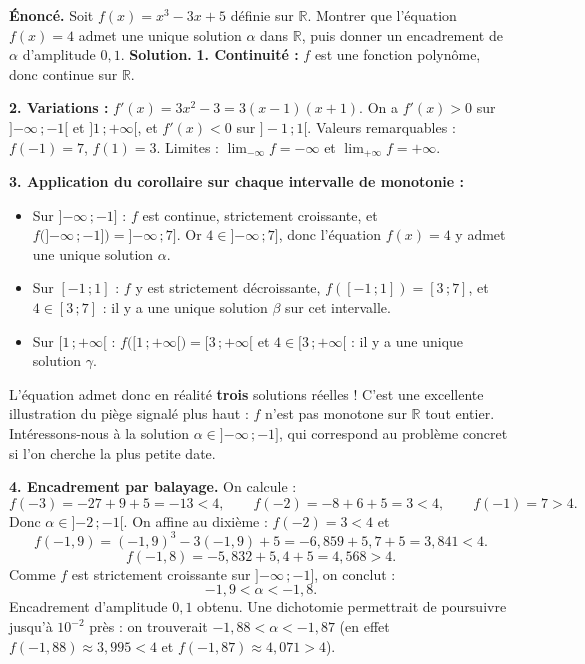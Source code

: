 \documentclass[11pt]{article}
\begin{document}
\begin{exoresolu}
\textbf{Énoncé.} Soit $f(x) = x^{3} - 3x + 5$ définie sur $\mathbb{R}$. Montrer que l'équation $f(x) = 4$ admet une unique solution $\alpha$ dans $\mathbb{R}$, puis donner un encadrement de $\alpha$ d'amplitude $0{,}1$.
\tcblower
\textbf{Solution.} \textbf{1. Continuité :} $f$ est une fonction polynôme, donc continue sur $\mathbb{R}$.

\textbf{2. Variations :} $f'(x) = 3x^{2} - 3 = 3(x-1)(x+1)$. On a $f'(x) > 0$ sur $]{-\infty}\,;-1[$ et $]1\,;+\infty[$, et $f'(x) < 0$ sur $]-1\,;1[$. Valeurs remarquables : $f(-1) = 7$, $f(1) = 3$. Limites : $\lim_{-\infty} f = -\infty$ et $\lim_{+\infty} f = +\infty$.

\textbf{3. Application du corollaire sur chaque intervalle de monotonie :}
\begin{itemize}
\item Sur $]{-\infty}\,;-1]$ : $f$ est continue, strictement croissante, et $f\big(]{-\infty}\,;-1]\big) = ]{-\infty}\,;7]$. Or $4 \in ]{-\infty}\,;7]$, donc l'équation $f(x) = 4$ y admet une unique solution $\alpha$.
\item Sur $[-1\,;1]$ : $f$ y est strictement décroissante, $f([-1\,;1]) = [3\,;7]$, et $4 \in [3\,;7]$ : il y a une unique solution $\beta$ sur cet intervalle.
\item Sur $[1\,;+\infty[$ : $f\big([1\,;+\infty[\big) = [3\,;+\infty[$ et $4 \in [3\,;+\infty[$ : il y a une unique solution $\gamma$.
\end{itemize}
L'équation admet donc en réalité \textbf{trois} solutions réelles ! C'est une excellente illustration du piège signalé plus haut : $f$ n'est pas monotone sur $\mathbb{R}$ tout entier. Intéressons-nous à la solution $\alpha \in ]{-\infty}\,;-1]$, qui correspond au problème concret si l'on cherche la plus petite date.

\textbf{4. Encadrement par balayage.} On calcule :
\[ f(-3) = -27 + 9 + 5 = -13 < 4, \qquad f(-2) = -8 + 6 + 5 = 3 < 4, \qquad f(-1) = 7 > 4. \]
Donc $\alpha \in ]{-2}\,;{-1}[$. On affine au dixième : $f(-2) = 3 < 4$ et
\[ f(-1{,}9) = (-1{,}9)^{3} - 3(-1{,}9) + 5 = -6{,}859 + 5{,}7 + 5 = 3{,}841 < 4. \]
\[ f(-1{,}8) = -5{,}832 + 5{,}4 + 5 = 4{,}568 > 4. \]
Comme $f$ est strictement croissante sur $]{-\infty}\,;-1]$, on conclut :
\[ -1{,}9 < \alpha < -1{,}8. \]
Encadrement d'amplitude $0{,}1$ obtenu. Une dichotomie permettrait de poursuivre jusqu'à $10^{-2}$ près : on trouverait $-1{,}88 < \alpha < -1{,}87$ (en effet $f(-1{,}88) \approx 3{,}995 < 4$ et $f(-1{,}87) \approx 4{,}071 > 4$).
\end{exoresolu}
\end{document}
